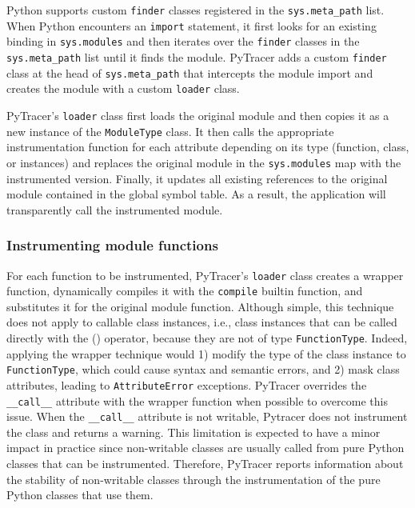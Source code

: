 \documentclass[10pt,journal,compsoc]{IEEEtran}
\newcommand{\pytracer}[0]{PyTracer\xspace}
\begin{document}
Python supports custom \texttt{finder} classes registered in the
\texttt{sys.meta\_path} list. When Python encounters an \texttt{import}
statement, it first looks for an existing binding in \texttt{sys.modules} and
then iterates over the \texttt{finder} classes in the \texttt{sys.meta\_path}
list until it finds the module. \pytracer adds a custom \texttt{finder} class at
the head of \texttt{sys.meta\_path} that intercepts the module import and
creates the module with a custom \texttt{loader} class.

\pytracer's \texttt{loader} class first loads the original module and then copies
it as a new instance of the \texttt{ModuleType} class. It then calls the
appropriate instrumentation function for each attribute depending on its type
(function, class, or instances) and replaces the original module in the
\texttt{sys.modules} map with the instrumented version. Finally, it updates all
existing references to the original module contained in the global symbol table.
As a result, the application will transparently call the instrumented module.

\subsubsection{Instrumenting module functions}

For each function to be instrumented, \pytracer's \texttt{loader} class creates a
wrapper function, dynamically compiles it with the \texttt{compile} builtin
function, and substitutes it for the original module function.  Although simple,
this technique does not apply to callable class instances, i.e., class instances
that can be called directly with the () operator, because they are not of type
\texttt{FunctionType}. Indeed, applying the wrapper technique would 1) modify
the type of the class instance to \texttt{FunctionType}, which could cause
syntax and semantic errors, and 2) mask class attributes, leading to
\texttt{AttributeError} exceptions. \pytracer overrides the
\texttt{\_\_call\_\_} attribute with the wrapper function when possible to
overcome this issue. When the \texttt{\_\_call\_\_} attribute is not writable,
Pytracer does not instrument the class and returns a warning. 
This limitation is expected to have a minor impact in practice since non-writable
classes are usually called from pure Python classes that can be
instrumented. Therefore, \pytracer reports information about the stability of
non-writable classes through the instrumentation of the pure Python
classes that use them.
\end{document}
